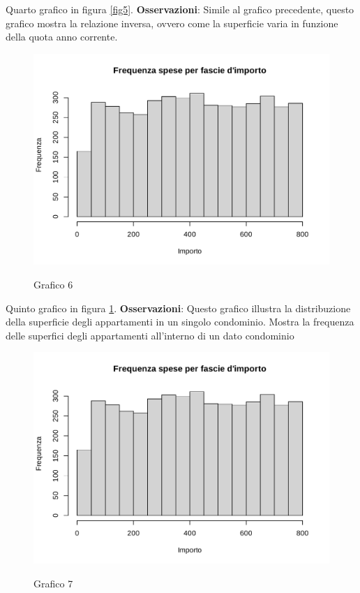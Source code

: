 Quarto grafico in figura \ref{fig5}. \textbf{Osservazioni}: Simile al grafico precedente, questo grafico mostra la relazione inversa, ovvero come la superficie varia in funzione della quota anno corrente.


\clearpage

\begin{figure}[t]
	\caption{Grafico 6}
	\includegraphics[page=6,width=\textwidth]{../R/grafici.pdf}
	\label{fig6}
\end{figure}

Quinto grafico in figura \ref{fig6}. \textbf{Osservazioni}: Questo grafico illustra la distribuzione della superficie degli appartamenti in un singolo condominio. Mostra la frequenza delle superfici degli appartamenti all'interno di un dato condominio


\clearpage

\begin{figure}[t]
	\caption{Grafico 7}
	\includegraphics[page=7,width=\textwidth]{../R/grafici.pdf}
	\label{fig7}
\end{figure}

